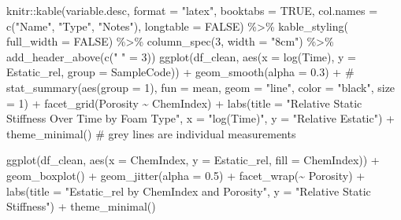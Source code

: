 \documentclass[
  letterpaper,
  DIV=11,
  numbers=noendperiod]{scrartcl}
\newenvironment{Shaded}{\begin{snugshade}}{\end{snugshade}}
\newcommand{\AttributeTok}[1]{\textcolor[rgb]{0.40,0.45,0.13}{#1}}
\newcommand{\CommentTok}[1]{\textcolor[rgb]{0.37,0.37,0.37}{#1}}
\newcommand{\ConstantTok}[1]{\textcolor[rgb]{0.56,0.35,0.01}{#1}}
\newcommand{\DecValTok}[1]{\textcolor[rgb]{0.68,0.00,0.00}{#1}}
\newcommand{\FloatTok}[1]{\textcolor[rgb]{0.68,0.00,0.00}{#1}}
\newcommand{\FunctionTok}[1]{\textcolor[rgb]{0.28,0.35,0.67}{#1}}
\newcommand{\NormalTok}[1]{\textcolor[rgb]{0.00,0.23,0.31}{#1}}
\newcommand{\OtherTok}[1]{\textcolor[rgb]{0.00,0.23,0.31}{#1}}
\newcommand{\SpecialCharTok}[1]{\textcolor[rgb]{0.37,0.37,0.37}{#1}}
\newcommand{\StringTok}[1]{\textcolor[rgb]{0.13,0.47,0.30}{#1}}
\begin{document}
\begin{Shaded}
\begin{Highlighting}[]
\NormalTok{knitr}\SpecialCharTok{::}\FunctionTok{kable}\NormalTok{(variable.desc, }\AttributeTok{format =} \StringTok{"latex"}\NormalTok{, }\AttributeTok{booktabs =} \ConstantTok{TRUE}\NormalTok{,}
             \AttributeTok{col.names =} \FunctionTok{c}\NormalTok{(}\StringTok{"Name"}\NormalTok{, }\StringTok{"Type"}\NormalTok{, }\StringTok{"Notes"}\NormalTok{),}
             \AttributeTok{longtable =} \ConstantTok{FALSE}\NormalTok{) }\SpecialCharTok{\%\textgreater{}\%}
  \FunctionTok{kable\_styling}\NormalTok{( }\AttributeTok{full\_width =} \ConstantTok{FALSE}\NormalTok{) }\SpecialCharTok{\%\textgreater{}\%}
  \FunctionTok{column\_spec}\NormalTok{(}\DecValTok{3}\NormalTok{, }\AttributeTok{width =} \StringTok{"8cm"}\NormalTok{) }\SpecialCharTok{\%\textgreater{}\%} 
  \FunctionTok{add\_header\_above}\NormalTok{(}\FunctionTok{c}\NormalTok{(}\StringTok{" "} \OtherTok{=} \DecValTok{3}\NormalTok{))}
\FunctionTok{ggplot}\NormalTok{(df\_clean, }\FunctionTok{aes}\NormalTok{(}\AttributeTok{x =} \FunctionTok{log}\NormalTok{(Time), }\AttributeTok{y =}\NormalTok{ Estatic\_rel, }\AttributeTok{group =}\NormalTok{ SampleCode)) }\SpecialCharTok{+}
  \FunctionTok{geom\_smooth}\NormalTok{(}\AttributeTok{alpha =} \FloatTok{0.3}\NormalTok{) }\SpecialCharTok{+}
 \CommentTok{\# stat\_summary(aes(group = 1), fun = mean, geom = "line", color = "black", size = 1) +}
  \FunctionTok{facet\_grid}\NormalTok{(Porosity }\SpecialCharTok{\textasciitilde{}}\NormalTok{ ChemIndex) }\SpecialCharTok{+}
  \FunctionTok{labs}\NormalTok{(}\AttributeTok{title =} \StringTok{"Relative Static Stiffness Over Time by Foam Type"}\NormalTok{,}
       \AttributeTok{x =} \StringTok{"log(Time)"}\NormalTok{,}
       \AttributeTok{y =} \StringTok{"Relative Estatic"}\NormalTok{) }\SpecialCharTok{+}
  \FunctionTok{theme\_minimal}\NormalTok{()}
\CommentTok{\# grey lines are individual measurements}

\FunctionTok{ggplot}\NormalTok{(df\_clean, }\FunctionTok{aes}\NormalTok{(}\AttributeTok{x =}\NormalTok{ ChemIndex, }\AttributeTok{y =}\NormalTok{ Estatic\_rel, }\AttributeTok{fill =}\NormalTok{ ChemIndex)) }\SpecialCharTok{+}
  \FunctionTok{geom\_boxplot}\NormalTok{() }\SpecialCharTok{+}
  \FunctionTok{geom\_jitter}\NormalTok{(}\AttributeTok{alpha =} \FloatTok{0.5}\NormalTok{) }\SpecialCharTok{+}
  \FunctionTok{facet\_wrap}\NormalTok{(}\SpecialCharTok{\textasciitilde{}}\NormalTok{ Porosity) }\SpecialCharTok{+}
  \FunctionTok{labs}\NormalTok{(}\AttributeTok{title =} \StringTok{"Estatic\_rel by ChemIndex and Porosity"}\NormalTok{,}
       \AttributeTok{y =} \StringTok{"Relative Static Stiffness"}\NormalTok{) }\SpecialCharTok{+}
  \FunctionTok{theme\_minimal}\NormalTok{()}


\end{Highlighting}
\end{Shaded}
\end{document}
